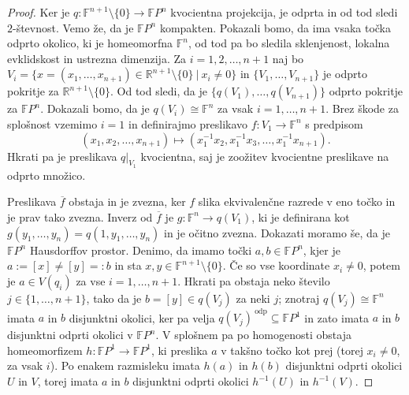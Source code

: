 \documentclass[10pt, a4paper]{article}
\newenvironment{noticeC}{%
  \tcolorbox[%
  notitle,
  empty,
  enhanced,  %
  breakable,
  coltext=black, 
  fontupper=\rmfamily,
  noparskip,
  sharp corners,
  boxrule=-1pt,  %
  frame hidden,
  left=7pt,  %
  right=7pt,
  top=5pt,
  bottom=5pt,
  before skip=2.5ex plus 2pt,
  after skip=2.5ex plus 2pt,
  overlay unbroken and last={%
  },
  ]}
{\endtcolorbox}
\newenvironment{dokaz}%
  {\begin{noticeC}\begin{proof}}%
  {\end{proof}\end{noticeC}}
\newcommand{\R}{\mathbb {R}}
\newcommand{\F}{\mathbb {F}}
\begin{document}
\begin{dokaz}
   Ker je $q: \F^{n + 1} \setminus \{0\} \to \F P^n$ kvocientna projekcija, je odprta in od tod sledi $2$-števnost.
   Vemo že, da je $\F P^n$ kompakten. Pokazali bomo, da ima vsaka točka odprto okolico,
   ki je homeomorfna $\F^n$, od tod pa bo sledila sklenjenost, lokalna evklidskost in ustrezna dimenzija.
   Za $i = 1, 2, \dots, n + 1$ naj bo $V_i = \{x = (x_1, \dots, x_{n +1}) \in \R^{n + 1} \setminus \{0\}\ |\ x_i \neq 0 \}$
   in $\{V_1, \dots, V_{n + 1}\}$ je odprto pokritje za $\R^{n + 1} \setminus \{0\}$.
   Od tod sledi, da je $\{q(V_1), \dots, q(V_{n + 1})\}$ odprto pokritje za $\F P^n$.
   Dokazali bomo, da je $q(V_i) \cong \F^n$ za vsak $i = 1, \dots, n + 1$.
   Brez škode za splošnost vzemimo $i = 1$ in definirajmo preslikavo $f: V_1 \to \F^n$
   s predpisom $$(x_1, x_2, \dots, x_{n+ 1}) \mapsto (x_1^{-1} x_2, x_1^{-1} x_3,\dots, x_1^{-1}x_{n + 1}).$$
   Hkrati pa je preslikava $q\big|_{V_1}$ kvocientna, saj je zoožitev kvocientne preslikave na odprto množico.
   \begin{center}
    \adjustbox{scale=1.5,center}{
      \begin{tikzcd}
        V_1 \arrow[r, "f"] \arrow[d, "q |_{V_1}"']
          & \F^{n} \\
        q(V_1) \arrow[ur, dashed, "\overline{f}"']
          & 
      \end{tikzcd}
    }  
  \end{center} 
  Preslikava $\overline{f}$ obstaja in je zvezna, ker $f$ slika ekvivalenčne 
  razrede v eno točko in je prav tako zvezna.
  Inverz od $\overline{f}$ je $g:\F^{n} \to q(V_1)$, ki je definirana kot
  $g(y_1, \dots, y_n) = q(1, y_1, \dots, y_n)$ in je očitno zvezna.
  Dokazati moramo še, da je $\F P^n$ Hausdorffov prostor.
  Denimo, da imamo točki $a, b \in \F P^n$, kjer je $a := [x] \neq [y] =: b$
  in sta $x, y \in \F^{n + 1} \setminus \{0\}$.
  Če so vse koordinate $x_i \neq 0$, potem je $a \in V(q_i)$ za vse $i = 1, \dots, n + 1$.
  Hkrati pa obstaja neko število $j \in \{1, \dots, n + 1\}$, tako da je 
  $b = [y] \in q(V_j)$ za neki $j$; znotraj $q(V_j) \cong \F^n$ imata $a$ in $b$ disjunktni okolici, ker pa velja
  $q(V_j)^{\ \text{odp}} \subseteq \F P^1$ in zato imata $a$ in $b$ disjunktni odprti okolici v $\F P^n$.
  V splošnem pa po homogenosti obstaja homeomorfizem $h: \F P^1 \to \F P^1$,
  ki preslika $a$ v takšno točko kot prej (torej $x_i \neq 0$, za vsak $i$).
  Po enakem razmisleku imata $h(a)$ in $h(b)$ disjunktni odprti okolici $U$ in $V$,
  torej imata $a$ in $b$ disjunktni odprti okolici $h^{-1} (U)$ in $h^{-1} (V)$.
\end{dokaz}
\end{document}
